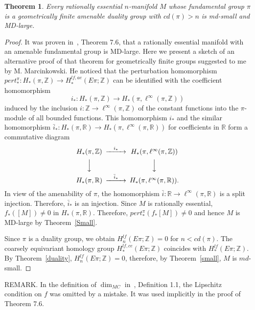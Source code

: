 \documentclass[12pt]{amsart}
\theoremstyle{plain}
\newtheorem{thm}{Theorem}[section]
\theoremstyle{definition}
\begin{document}
\begin{thm}\label{ex}
Every rationally essential $n$-manifold  $M$ whose fundamental group $\pi$ is a geometrically finite amenable duality group with $cd(\pi)>n$  is  md-small and MD-large.
\end{thm}
\begin{proof}
It was proven in~\cite{Dr2}, Theorem 7.6, that a rationally essential manifold with an amenable fundamental group is
MD-large. Here we present a sketch of an alternative proof of that theorem for geometrically finite groups suggested to me by M. Marcinkowski. 
He  noticed that
the perturbation homomorphism $pert^{\pi}_*:H_*(\pi,\mathbb Z)\to H_*^{lf,ae}(E\pi;\mathbb Z)$ can be identified with the coefficient homomorphism $$i_*:H_*(\pi,\mathbb Z)\to H_*(\pi,\ell^{\infty}(\pi,\mathbb Z))$$ induced by the inclusion $i:\mathbb Z\to \ell^{\infty}(\pi,\mathbb Z)$ of  the constant functions into the $\pi$-module of all bounded functions. This homomorphism $i_*$ and the similar homomorphism 
$\bar i_*:H_*(\pi,\mathbb R)\to H_*(\pi,\ell^{\infty}(\pi,\mathbb R))$ for coefficients in $\mathbb R$ form a commutative diagram
$$
\begin{CD}
H_*(\pi,\mathbb Z) @>i_*>> H_*(\pi,\ell^{\infty}(\pi,\mathbb Z))\\
@VVV @VVV\\
H_*(\pi,\mathbb R) @>\bar i_*>> H_*(\pi,\ell^{\infty}(\pi,\mathbb R)).\\
\end{CD}
$$
In view of the amenability of $\pi$, the homomorphism $\bar i:\mathbb R\to \ell^{\infty}(\pi,\mathbb R)$ is a split injection. Therefore, $\bar i_*$ is
an injection. Since $M$ is rationally essential, $f_*([M])\ne 0$ in $H_*(\pi,\mathbb R)$. Therefore, $pert^{\pi}_*(f_*[M])\ne 0$ and hence $M$ is MD-large by Theorem~\ref{Small}.

Since $\pi$ is a duality group, we obtain $H^{lf}_n(E\pi;\mathbb Z)=0$ for $n< cd(\pi)$.
The coarsely equivariant homology group $H^{lf,ce}_*(E\pi;\mathbb Z)$ coincides with $H^{lf}_*(E\pi;\mathbb Z)$.
By Theorem~\ref{duality}, $H_n^{lf}(E\pi;\mathbb Z)=0$, therefore,  by Theorem~\ref{small}, $M$ is $md$-small.
\end{proof}

REMARK. In the definition of $\dim_{MC}$ in~\cite{Dr2}, Definition 1.1, the Lipschitz condition on $f$ was omitted by a mistake. It was used implicitly in the proof of Theorem 7.6.
\\
\\
\end{document}
